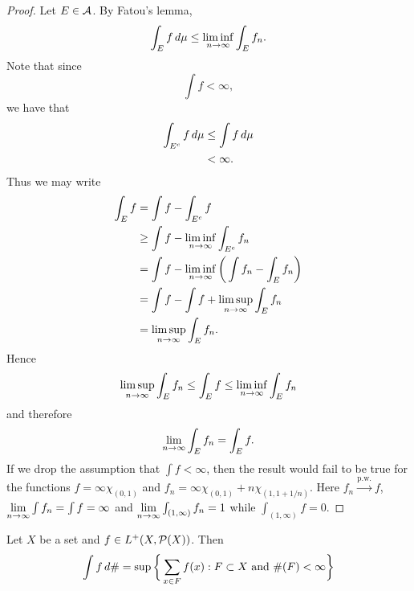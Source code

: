 \documentclass{book}
\begin{document}
	\begin{proof}
		Let $E \in \mathcal{A}$. By Fatou's lemma, 
		$$\int_E f \, d \mu \leq \liminf \limits_{n \rightarrow \infty} \int_E f_n.$$ 
		Note that since 
		$$\int f < \infty,$$ we have that 
		\begin{align*}
			\int_{E^c} f \, d \mu 
			& \leq \int f \, d \mu  \\
			& < \infty.
		\end{align*} 
		Thus we may write
		\begin{align*}
			\int_E f 
			&= \int f - \int_{E^c} f\\
			&\geq \int f - \liminf \limits_{n \rightarrow \infty} \int_{E^c} f_n\\
			&= \int f - \liminf \limits_{n \rightarrow \infty} \bigg(\int f_n - \int_{E} f_n\bigg)\\
			&= \int f - \int f  + \limsup \limits_{n \rightarrow \infty} \int_{E} f_n\\
			&= \limsup \limits_{n \rightarrow \infty} \int_E f_n.
		\end{align*}
		Hence 
		$$\limsup \limits_{n \rightarrow \infty} \int_E f_n \leq \int_E f \leq \liminf \limits_{n \rightarrow \infty} \int_E f_n$$ and therefore $$\lim \limits_{n \rightarrow \infty} \int_E f_n = \int_E f.$$ 
		If we drop the assumption that $\int f < \infty$, then the result would fail to be true for the functions $f = \infty \chi_{(0,1)}$ and $ f_n = \infty \chi_{(0,1)} + n \chi_{(1,1+1/n)}$. Here $f_n \xrightarrow{\text{p.w.}} f$, $\lim \limits_{n \rightarrow \infty} \int f_n = \int f = \infty$ and $\lim \limits_{n \rightarrow \infty} \int_{(1,\infty)} f_n = 1$ while $\int_{(1,\infty)} f = 0$.  
	\end{proof}

	\begin{ex}  
		Let $X$ be a set and $f \in L^+(X, \mathcal{P}(X))$. Then 
		$$\int f \, d \# =  \sup \bigg \{\sum\limits_{x \in F}f(x): F \subset X \text{ and } \#(F) < \infty \bigg \}$$
	\end{ex} 
\end{document}
